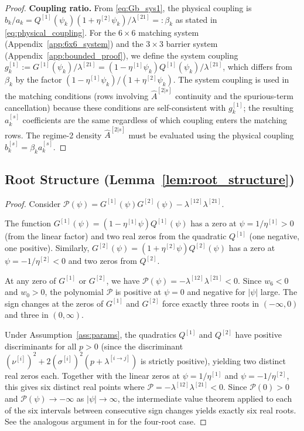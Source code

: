 \documentclass[11pt,a4paper]{article}
\numberwithin{equation}{section}
\begin{document}
\begin{appendices}
\begin{proof}
\medskip\noindent\textbf{Coupling ratio.} From \eqref{eq:Gb_sys1}, the physical coupling is $b_k/a_k = Q^{[1]}(\psi_k)(1+\eta^{[2]}\psi_k) / \lambda^{[21]} =: \beta_k$ as stated in \eqref{eq:physical_coupling}. For the $6\times 6$ matching system (Appendix~\ref{app:6x6_system}) and the $3 \times 3$ barrier system (Appendix~\ref{app:bounded_proof}), we define the system coupling $g^{[1]}_k := G^{[1]}(\psi_k)/\lambda^{[21]} = (1-\eta^{[1]}\psi_k)Q^{[1]}(\psi_k)/\lambda^{[21]}$, which differs from $\beta_k$ by the factor $(1-\eta^{[1]}\psi_k)/(1+\eta^{[2]}\psi_k)$. The system coupling is used in the matching conditions (rows involving $\hat{A}^{[2|s]}$ continuity and the spurious-term cancellation) because these conditions are self-consistent with $g^{[1]}_k$; the resulting $a^{[s]}_k$ coefficients are the same regardless of which coupling enters the matching rows. The regime-2 density $\hat{A}^{[2|s]}$ must be evaluated using the physical coupling $b^{[s]}_k = \beta_k a^{[s]}_k$.
\end{proof}


\subsection{Root Structure (Lemma~\ref{lem:root_structure})}\label{app:root_structure}

\begin{proof}
Consider $\mathcal{P}(\psi) = G^{[1]}(\psi)G^{[2]}(\psi) - \lambda^{[12]}\lambda^{[21]}$.

The function $G^{[1]}(\psi) = (1-\eta^{[1]}\psi)Q^{[1]}(\psi)$ has a zero at $\psi = 1/\eta^{[1]} > 0$ (from the linear factor) and two real zeros from the quadratic $Q^{[1]}$ (one negative, one positive). Similarly, $G^{[2]}(\psi) = (1+\eta^{[2]}\psi)Q^{[2]}(\psi)$ has a zero at $\psi = -1/\eta^{[2]} < 0$ and two zeros from $Q^{[2]}$.

At any zero of $G^{[1]}$ or $G^{[2]}$, we have $\mathcal{P}(\psi) = -\lambda^{[12]}\lambda^{[21]} < 0$. Since $w_6 < 0$ and $w_0 > 0$, the polynomial $\mathcal{P}$ is positive at $\psi = 0$ and negative for $|\psi|$ large. The sign changes at the zeros of $G^{[1]}$ and $G^{[2]}$ force exactly three roots in $(-\infty, 0)$ and three in $(0, \infty)$.

Under Assumption~\ref{ass:params}, the quadratics $Q^{[1]}$ and 
$Q^{[2]}$ have positive discriminants for all $p > 0$ (since the 
discriminant $(\nu^{[i]})^2 + 2(\sigma^{[i]})^2(p + \lambda^{[i \to j]})$ 
is strictly positive), yielding two distinct real zeros each. Together 
with the linear zeros at $\psi = 1/\eta^{[1]}$ and 
$\psi = -1/\eta^{[2]}$, this gives six distinct real points where 
$\mathcal{P} = -\lambda^{[12]}\lambda^{[21]} < 0$. Since 
$\mathcal{P}(0) > 0$ and $\mathcal{P}(\psi) \to -\infty$ as 
$|\psi| \to \infty$, the intermediate value theorem applied to each of 
the six intervals between consecutive sign changes yields exactly six 
real roots. See the analogous argument in \citet{Sepp2004} for the four-root case.
\end{proof}



\end{appendices}
\end{document}
